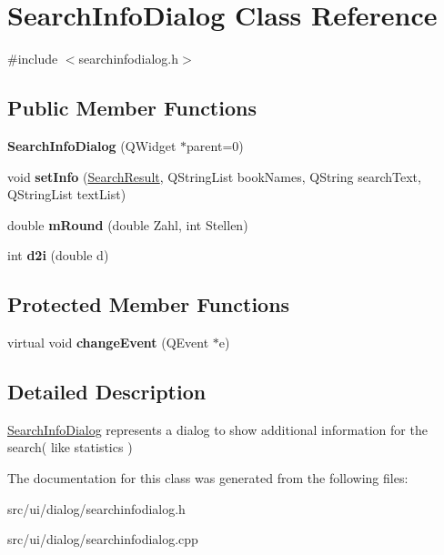 \hypertarget{classSearchInfoDialog}{
\section{SearchInfoDialog Class Reference}
\label{classSearchInfoDialog}
}


{\ttfamily \#include $<$searchinfodialog.h$>$}

\subsection*{Public Member Functions}
\begin{DoxyCompactItemize}
\item 
\hypertarget{classSearchInfoDialog_a1baf3903eb275cf883a38cc533011132}{
{\bfseries SearchInfoDialog} (QWidget $\ast$parent=0)}
\label{classSearchInfoDialog_a1baf3903eb275cf883a38cc533011132}

\item 
\hypertarget{classSearchInfoDialog_a6d0179b3897eadc1e9448115f81eec2e}{
void {\bfseries setInfo} (\hyperlink{classSearchResult}{SearchResult}, QStringList bookNames, QString searchText, QStringList textList)}
\label{classSearchInfoDialog_a6d0179b3897eadc1e9448115f81eec2e}

\item 
\hypertarget{classSearchInfoDialog_a14b9e98ca49d1a408ec94772aeef6f5e}{
double {\bfseries mRound} (double Zahl, int Stellen)}
\label{classSearchInfoDialog_a14b9e98ca49d1a408ec94772aeef6f5e}

\item 
\hypertarget{classSearchInfoDialog_a8b550144a861f190deae6c8b11c891e8}{
int {\bfseries d2i} (double d)}
\label{classSearchInfoDialog_a8b550144a861f190deae6c8b11c891e8}

\end{DoxyCompactItemize}
\subsection*{Protected Member Functions}
\begin{DoxyCompactItemize}
\item 
\hypertarget{classSearchInfoDialog_a011443f10f6863a165787edfc1db61f7}{
virtual void {\bfseries changeEvent} (QEvent $\ast$e)}
\label{classSearchInfoDialog_a011443f10f6863a165787edfc1db61f7}

\end{DoxyCompactItemize}


\subsection{Detailed Description}
\hyperlink{classSearchInfoDialog}{SearchInfoDialog} represents a dialog to show additional information for the search( like statistics ) 

The documentation for this class was generated from the following files:\begin{DoxyCompactItemize}
\item 
src/ui/dialog/searchinfodialog.h\item 
src/ui/dialog/searchinfodialog.cpp\end{DoxyCompactItemize}
